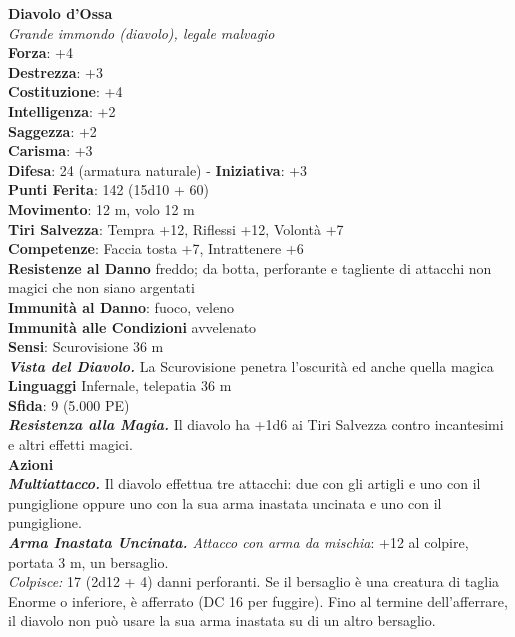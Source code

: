 \begin{multicols}{2}
\medskip\textbf{Diavolo d'Ossa}\\
\emph{Grande immondo (diavolo), legale malvagio}\\
\textbf{Forza}: +4\\
\textbf{Destrezza}: +3\\
\textbf{Costituzione}: +4\\
\textbf{Intelligenza}: +2\\
\textbf{Saggezza}: +2\\
\textbf{Carisma}: +3\\
\textbf{Difesa}: 24 (armatura naturale) - \textbf{Iniziativa}: +3\\
\textbf{Punti Ferita}: 142 (15d10 + 60)\\
\textbf{Movimento}: 12 m, volo 12 m\\
\textbf{Tiri Salvezza}: Tempra +12, Riflessi +12, Volontà +7\\
\textbf{Competenze}: Faccia tosta +7, Intrattenere +6\\
\textbf{Resistenze al Danno} freddo; da botta, perforante e tagliente di attacchi non magici che non siano argentati\\
\textbf{Immunità al Danno}: fuoco, veleno\\
\textbf{Immunità alle Condizioni} avvelenato\\
\textbf{Sensi}: Scurovisione 36 m\\
\emph{\textbf{Vista del Diavolo.}} La Scurovisione penetra l'oscurità ed anche quella magica\\
\textbf{Linguaggi} Infernale, telepatia 36 m \\
\textbf{Sfida}: 9 (5.000 PE)\smallskip\\
\emph{\textbf{Resistenza alla Magia.}} Il diavolo ha +1d6 ai Tiri Salvezza contro incantesimi e altri effetti magici.\\
\smallskip\textbf{Azioni}\\
\emph{\textbf{Multiattacco.}} Il diavolo effettua tre attacchi: due con gli artigli e uno con il pungiglione oppure uno con la sua arma inastata uncinata e uno con il pungiglione.\\
\emph{\textbf{Arma Inastata Uncinata.} Attacco con arma da mischia}: +12 al colpire, portata 3 m, un bersaglio.\\
\emph{Colpisce:} 17 (2d12 + 4) danni perforanti. Se il bersaglio è una creatura di taglia Enorme o inferiore, è afferrato (DC  16 per fuggire). Fino al termine dell'afferrare, il diavolo non può usare la sua arma inastata su di un altro bersaglio.\\

\end{multicols}
